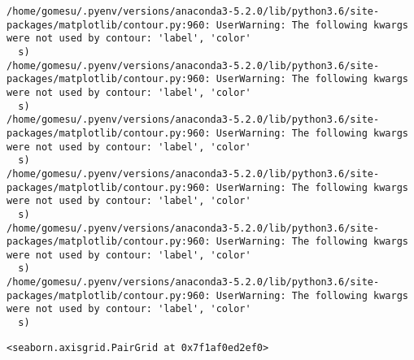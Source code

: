 \documentclass[11pt]{article}
\begin{document}
    \begin{Verbatim}[commandchars=\\\{\}]
/home/gomesu/.pyenv/versions/anaconda3-5.2.0/lib/python3.6/site-packages/matplotlib/contour.py:960: UserWarning: The following kwargs were not used by contour: 'label', 'color'
  s)
/home/gomesu/.pyenv/versions/anaconda3-5.2.0/lib/python3.6/site-packages/matplotlib/contour.py:960: UserWarning: The following kwargs were not used by contour: 'label', 'color'
  s)
/home/gomesu/.pyenv/versions/anaconda3-5.2.0/lib/python3.6/site-packages/matplotlib/contour.py:960: UserWarning: The following kwargs were not used by contour: 'label', 'color'
  s)
/home/gomesu/.pyenv/versions/anaconda3-5.2.0/lib/python3.6/site-packages/matplotlib/contour.py:960: UserWarning: The following kwargs were not used by contour: 'label', 'color'
  s)
/home/gomesu/.pyenv/versions/anaconda3-5.2.0/lib/python3.6/site-packages/matplotlib/contour.py:960: UserWarning: The following kwargs were not used by contour: 'label', 'color'
  s)
/home/gomesu/.pyenv/versions/anaconda3-5.2.0/lib/python3.6/site-packages/matplotlib/contour.py:960: UserWarning: The following kwargs were not used by contour: 'label', 'color'
  s)

    \end{Verbatim}

    
    \begin{verbatim}
<seaborn.axisgrid.PairGrid at 0x7f1af0ed2ef0>
    \end{verbatim}

    
    \begin{center}
    \end{center}
    { \hspace*{\fill} \\}
    
\end{document}
